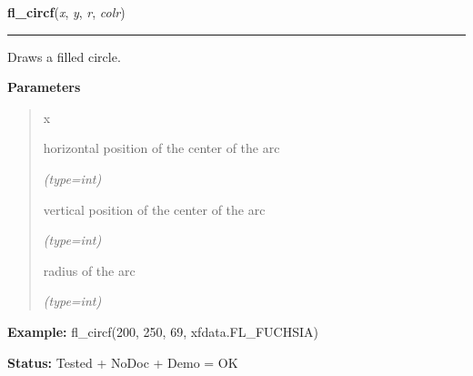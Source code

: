     \label{xformslib:flxbasic:fl_circf}

    \vspace{0.5ex}

\hspace{.8\funcindent}\begin{boxedminipage}{\funcwidth}

    \raggedright \textbf{fl\_circf}(\textit{x}, \textit{y}, \textit{r}, \textit{colr})

    \vspace{-1.5ex}

    \rule{\textwidth}{0.5\fboxrule}
\setlength{\parskip}{2ex}
    Draws a filled circle.

\setlength{\parskip}{1ex}
      \textbf{Parameters}
      \vspace{-1ex}

      \begin{quote}
        \begin{Ventry}{x}

          \item[x]

          horizontal position of the center of the arc

            {\it (type=int)}

          \item[y]

          vertical position of the center of the arc

            {\it (type=int)}

          \item[r]

          radius of the arc

            {\it (type=int)}

        \end{Ventry}

      \end{quote}

\textbf{Example:} fl\_circf(200, 250, 69, xfdata.FL\_FUCHSIA)



\textbf{Status:} Tested + NoDoc + Demo = OK



    \end{boxedminipage}

    \label{xformslib:flxbasic:fl_circ}

